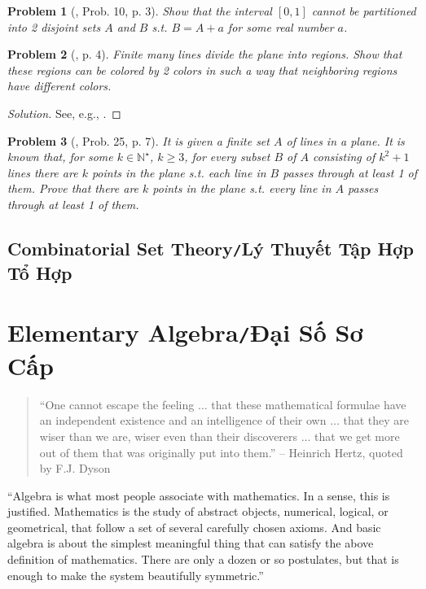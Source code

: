 \documentclass[oneside]{book}
\numberwithin{equation}{section}
\newtheorem{problem}{Problem}[section]
\begin{document}
\begin{problem}[\cite{Gelca_Andreescu2017}, Prob. 10, p. 3]
	Show that the interval $[0,1]$ cannot be partitioned into 2 disjoint sets $A$ and $B$ s.t. $B = A + a$ for some real number $a$.
\end{problem}

\begin{problem}[\cite{Gelca_Andreescu2017}, p. 4]
	Finite many lines divide the plane into regions. Show that these regions can be colored by 2 colors in such a way that neighboring regions have different colors.
\end{problem}

\begin{proof}[Solution]
	See, e.g., \cite[p. 4]{Gelca_Andreescu2017}.
\end{proof}

\begin{problem}[\cite{Gelca_Andreescu2017}, Prob. 25, p. 7]
	It is given a finite set $A$ of lines in a plane. It is known that, for some $k\in\mathbb{N}^\star$, $k\ge 3$, for every subset $B$ of $A$ consisting of $k^2 + 1$ lines there are $k$ points in the plane s.t. each line in $B$ passes through at least 1 of them. Prove that there are $k$ points in the plane s.t. every line in $A$ passes through at least 1 of them.
\end{problem}

\section{Combinatorial Set Theory\texttt{/}Lý Thuyết Tập Hợp Tổ Hợp}


\chapter{Elementary Algebra\texttt{/}Đại Số Sơ Cấp}
\begin{quotation}
	``One cannot escape the feeling $\ldots$ that these mathematical formulae have an independent existence and an intelligence of their own $\ldots$ that they are wiser than we are, wiser even than their discoverers $\ldots$ that we get more out of them that was originally put into them.'' -- Heinrich Hertz, quoted by F.J. Dyson
\end{quotation}
``Algebra is what most people associate with mathematics. In a sense, this is justified. Mathematics is the study of abstract objects, numerical, logical, or geometrical, that follow a set of several carefully chosen axioms. And basic algebra is about the simplest meaningful thing that can satisfy the above definition of mathematics. There are only a dozen or so postulates, but that is enough to make the system beautifully symmetric.''
\end{document}
